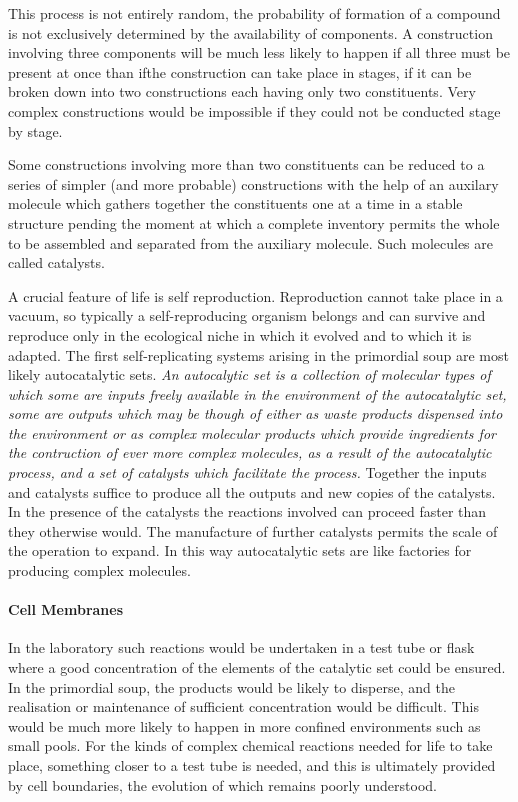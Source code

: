 \documentclass[10pt,titlepage]{article}
\begin{document}
    This process is not entirely random, the probability of formation of a compound is not exclusively determined by the availability of components.
    A construction involving three components will be much less likely to happen if all three must be present at once than ifthe construction can take place in stages, if it can be broken down into two constructions each having only two constituents.
    Very complex constructions would be impossible if they could not be conducted stage by stage.

    Some constructions involving more than two constituents can be reduced to a series of simpler (and more probable) constructions with the help of an auxilary molecule which gathers together the constituents one at a time in a stable structure pending the moment at which a complete inventory permits the whole to be assembled and separated from the auxiliary molecule.
    Such molecules are called catalysts.

    A crucial feature of life is self reproduction.
    Reproduction cannot take place in a vacuum, so typically a self-reproducing organism belongs and can survive and reproduce only in the ecological niche in which it evolved and to which it is adapted.
    The first self-replicating systems arising in the primordial soup are most likely autocatalytic sets.
   \emph{ An autocalytic set is a collection of molecular types of which some are inputs freely available in the environment of the autocatalytic set, some are outputs which may be though of either as waste products dispensed into the environment or as complex molecular products which provide ingredients for the contruction of ever more complex molecules, as a result of the autocatalytic process, and a set of catalysts which facilitate the process.}
    Together the inputs and catalysts suffice to produce all the outputs and new copies of the catalysts.
    In the presence of the catalysts the reactions involved can proceed faster than they otherwise would.
    The manufacture of further catalysts permits the scale of the operation to expand.
    In this way autocatalytic sets are like factories for producing complex molecules.

\paragraph{Cell Membranes}
    In the laboratory such reactions would be undertaken in a test tube or flask where a good concentration of the elements of the catalytic set could be ensured.
    In the primordial soup, the products would be likely to disperse, and the realisation or maintenance of sufficient concentration would be difficult.
    This would be much more likely to happen in more confined environments such as small pools.
    For the kinds of complex chemical reactions needed for life to take place, something closer to a test tube is needed, and this is ultimately provided by cell boundaries, the evolution of which remains poorly understood.
\end{document}
